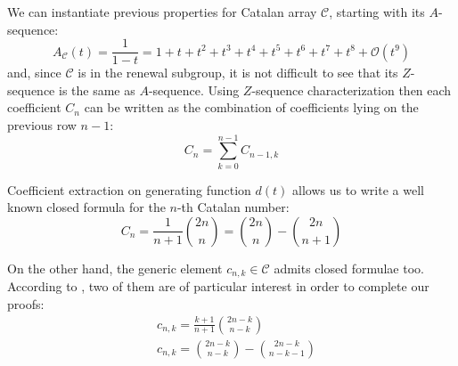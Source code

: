 We can instantiate previous properties for Catalan array $\mathcal{C}$, starting with its $A$-sequence:
\begin{displaymath}
    A_{\mathcal{C}}(t)=\frac{1}{1-t}=1+t+t^{2}+t^{3}+t^{4}+t^{5}+t^{6}+t^{7}+t^{8}+
        \mathcal{O}(t^{9})
\end{displaymath}
and, since $\mathcal{C}$ is in the renewal subgroup, it is not difficult to see that its
$Z$-sequence is the same as $A$-sequence. Using $Z$-sequence characterization then 
each coefficient $C_{n}$ can be written as the combination of coefficients lying on the previous row $n-1$:
\begin{displaymath}
    C_{n} = \sum_{k=0}^{n-1}{C_{n-1,k}}
\end{displaymath}
\iffalse
in other words, $C_{n}$ equals the $(n-1)$-row sum of $\mathcal{C}$, 
therefore by the fundamental theorem:
\begin{displaymath}
    C_{n} = [t^{n-1}]\mathcal{C}\,A_{\mathcal{C}}(t)
          = [t^{n-1}]d(t)\,A_{\mathcal{C}}(h(t))
          = [t^{n}]h(t)\,A_{\mathcal{C}}(h(t))
\end{displaymath}
yielding:
\begin{displaymath}
    C_{n} = [t^{n}]\frac{1-\sqrt{1-4 \, t}}{1+\sqrt{1-4 \, t}}
\end{displaymath}
for $n>0$ and boundary condition $C_{0}=1$. 
Moreover, from the above equation, it is possible to derive
another generating function for the sequence of Catalan numbers:
\begin{displaymath}
    \frac{1-\sqrt{1-4 \, t}}{1+\sqrt{1-4 \, t}}=
    \frac{\left(1-\sqrt{1-4 \, t}\right)^{2}}{4 \, t}=
    \frac{1-2\,t-\sqrt{1-4 \, t}}{2 \, t}
\end{displaymath}
\fi
Coefficient extraction on generating function $d(t)$ allows us to write 
a well known closed formula for the $n$-th Catalan number:
\begin{equation}
    C_{n} = \frac{1}{n+1}{{2n}\choose{n}} 
        = {{2n}\choose{n}} - {{2n}\choose{n+1}}
    \label{eq:catalan:coeff:rewriting}
\end{equation}

On the other hand, the generic element $c_{n,k}\in\mathcal{C}$ 
admits closed formulae too. According to
\cite{luzon:2012631}, two of them are of
particular interest in order to complete our proofs:
\begin{align}
    & c_{n,k}=\frac{k+1}{n+1}{{2n-k}\choose{n-k}}
    \label{eq:catalan:array:first:identity}\\
    & c_{n,k}={{2n-k}\choose{n-k}} - {{2n-k}\choose{n-k-1}}
    \label{eq:catalan:array:second:identity}
\end{align}

